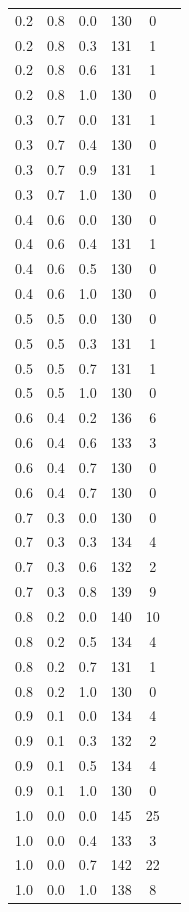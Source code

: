 \documentclass[12pt]{report}
\begin{document}
\begin{table}[H]
\begin{center}
\begin{tabular}{|c@{\hspace{7mm}}|c@{\hspace{7mm}}|c@{\hspace{7mm}}|c@{\hspace{7mm}}|c@{\hspace{7mm}}|c|}
			0.2  & 0.8  & 0.0    & 130    & 0     \\
			0.2  & 0.8  & 0.3    & 131    & 1     \\
			0.2  & 0.8  & 0.6    & 131    & 1     \\
			0.2  & 0.8  & 1.0    & 130    & 0     \\
			\hline
			0.3  & 0.7  & 0.0  & 131    & 1     \\
			0.3  & 0.7  & 0.4  & 130    & 0     \\
			0.3  & 0.7  & 0.9  & 131    & 1     \\
			0.3  & 0.7  & 1.0  & 130    & 0     \\
			\hline
			0.4  & 0.6  & 0.0  & 130    & 0     \\
			0.4  & 0.6  & 0.4  & 131    & 1     \\
			0.4  & 0.6  & 0.5  & 130    & 0     \\
			0.4  & 0.6  & 1.0  & 130    & 0     \\
			\hline
			0.5  & 0.5  & 0.0  & 130    & 0     \\
			0.5  & 0.5  & 0.3  & 131    & 1     \\
			0.5  & 0.5  & 0.7  & 131    & 1     \\
			0.5  & 0.5  & 1.0  & 130    & 0     \\
			\hline
			0.6  & 0.4  & 0.2  & 136    & 6     \\
			0.6  & 0.4  & 0.6  & 133    & 3     \\
			0.6  & 0.4  & 0.7  & 130    & 0     \\
			0.6  & 0.4  & 0.7  & 130    & 0     \\
			\hline
			0.7  & 0.3  & 0.0  & 130    & 0     \\
			0.7  & 0.3  & 0.3  & 134    & 4     \\
			0.7  & 0.3  & 0.6  & 132    & 2     \\
			0.7  & 0.3  & 0.8  & 139    & 9     \\
			\hline
			0.8  & 0.2  & 0.0  & 140    & 10    \\
			0.8  & 0.2  & 0.5  & 134    & 4     \\
			0.8  & 0.2  & 0.7  & 131    & 1     \\
			0.8  & 0.2  & 1.0  & 130    & 0     \\
			\hline
			0.9  & 0.1  & 0.0  & 134    & 4     \\
			0.9  & 0.1  & 0.3  & 132    & 2     \\
			0.9  & 0.1  & 0.5  & 134    & 4     \\
			0.9  & 0.1  & 1.0  & 130    & 0     \\
			\hline
			1.0  & 0.0  & 0.0  & 145    & 25     \\
			1.0  & 0.0  & 0.4  & 133    & 3     \\
			1.0  & 0.0  & 0.7  & 142    & 22     \\
			1.0  & 0.0  & 1.0  & 138    & 8     \\
			\hline
		\end{tabular}


\end{center}
\end{table}
\end{document}
